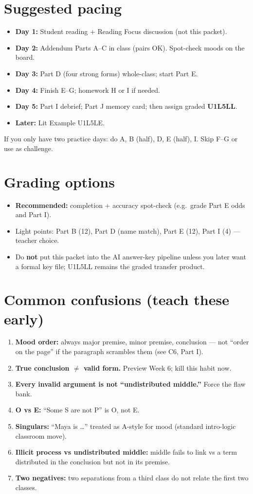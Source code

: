 \documentclass[11pt]{article}
\begin{document}
\section{Suggested pacing}
\begin{itemize}
\item \textbf{Day 1:} Student reading + Reading Focus discussion (not this packet).
\item \textbf{Day 2:} Addendum Parts A--C in class (pairs OK). Spot-check moods on the board.
\item \textbf{Day 3:} Part D (four strong forms) whole-class; start Part E.
\item \textbf{Day 4:} Finish E--G; homework H or I if needed.
\item \textbf{Day 5:} Part I debrief; Part J memory card; then assign graded \textbf{U1L5LL}.
\item \textbf{Later:} Lit Example U1L5LE.
\end{itemize}
If you only have two practice days: do A, B (half), D, E (half), I. Skip F--G or use as challenge.

\section{Grading options}
\begin{itemize}
\item \textbf{Recommended:} completion + accuracy spot-check (e.g.\ grade Part E odds and Part I).
\item Light points: Part B (12), Part D (name match), Part E (12), Part I (4) --- teacher choice.
\item Do \textbf{not} put this packet into the AI answer-key pipeline unless you later want a formal key file; U1L5LL remains the graded transfer product.
\end{itemize}

\section{Common confusions (teach these early)}
\begin{enumerate}
\item \textbf{Mood order:} always major premise, minor premise, conclusion --- not ``order on the page'' if the paragraph scrambles them (see C6, Part I).
\item \textbf{True conclusion $\neq$ valid form.} Preview Week 6; kill this habit now.
\item \textbf{Every invalid argument is not ``undistributed middle.''} Force the flaw bank.
\item \textbf{O vs E:} ``Some S are not P'' is O, not E.
\item \textbf{Singulars:} ``Maya is \ldots'' treated as A-style for mood (standard intro-logic classroom move).
\item \textbf{Illicit process vs undistributed middle:} middle fails to link vs a term distributed in the conclusion but not in its premise.
\item \textbf{Two negatives:} two separations from a third class do not relate the first two classes.
\end{enumerate}
\end{document}
